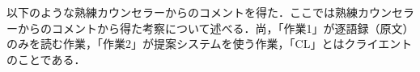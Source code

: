 \documentclass[shuuron]{kuee}
\begin{document}
以下のような熟練カウンセラーからのコメントを得た．ここでは熟練カウンセラーからのコメントから得た考察について述べる．尚，「作業1」が逐語録（原文）のみを読む作業，「作業2」が提案システムを使う作業，「CL」とはクライエントのことである．
%
%
\end{document}

